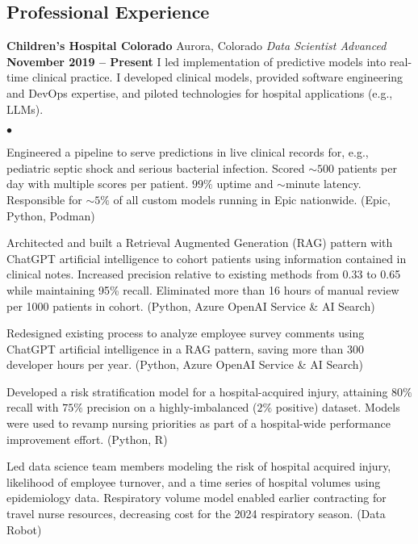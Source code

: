 \documentclass[margin,line, 11pt]{res}
\newenvironment{list2}{
  \begin{list}{$\bullet$}{%
      \setlength{\itemsep}{0in}
      \setlength{\parsep}{0in} \setlength{\parskip}{0in}
      \setlength{\topsep}{0in} \setlength{\partopsep}{0in}
      \setlength{\leftmargin}{0.2in}}}{\end{list}}
\begin{document}
\begin{resume}
\section{Professional \newline Experience}
\textbf{Children's Hospital Colorado} \hfill Aurora, Colorado\newline
\textit{Data Scientist Advanced} \hfill \textbf{November 2019 -- Present}\newline
I led implementation of predictive models into real-time clinical practice. I developed clinical models, provided software engineering and DevOps expertise, and piloted technologies for hospital applications (e.g., LLMs).
    \begin{list2}
      \item Engineered a pipeline to serve predictions in live clinical records for, e.g., pediatric septic shock and serious bacterial infection. Scored $\sim500$ patients per day with multiple scores per patient. $99\%$ uptime and $\sim$minute latency. Responsible for $\sim5\%$ of all custom models running in Epic nationwide. (Epic, Python, Podman)
      \item Architected and built a Retrieval Augmented Generation (RAG) pattern with ChatGPT artificial intelligence to cohort patients using information contained in clinical notes. Increased precision relative to existing methods from 0.33 to 0.65 while maintaining 95\% recall. Eliminated more than 16 hours of manual review per 1000 patients in cohort. (Python, Azure OpenAI Service \& AI Search)
      \item Redesigned existing process to analyze employee survey comments using ChatGPT artificial intelligence in a RAG pattern, saving more than 300 developer hours per year. (Python, Azure OpenAI Service \& AI Search)
      \item Developed a risk stratification model for a hospital-acquired injury, attaining $80\%$ recall with $75\%$ precision on a highly-imbalanced ($2\%$ positive) dataset. Models were used to revamp nursing priorities as part of a hospital-wide performance improvement effort. (Python, R)
      \item Led data science team members modeling the risk of hospital acquired injury, likelihood of employee turnover, and a time series of hospital volumes using epidemiology data. Respiratory volume model enabled earlier contracting for travel nurse resources, decreasing cost for the 2024 respiratory season. (Data Robot)

\end{list2}
\end{resume}
\end{document}
